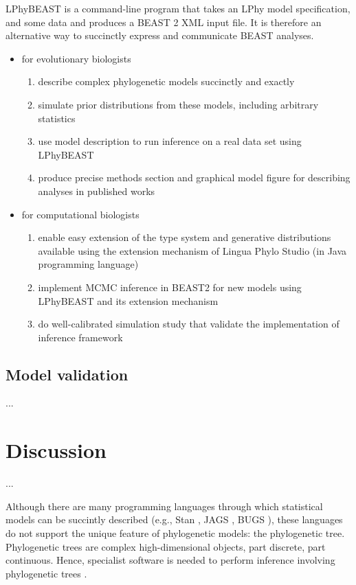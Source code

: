 \documentclass[10pt,letterpaper,table]{article}
\begin{document}
{LPhyBEAST is a command-line program that takes an LPhy model
specification, and some data and produces a BEAST 2 XML input file.
It is therefore an alternative way to succinctly express and
communicate BEAST analyses.

\begin{itemize}
\item for evolutionary biologists
\begin{enumerate}
\item describe complex phylogenetic models succinctly and exactly
\item simulate prior distributions from these models, including arbitrary statistics
\item use model description to run inference on a real data set using LPhyBEAST
\item produce precise methods section and graphical model figure for describing analyses in published works
\end{enumerate}
\item for computational biologists
\begin{enumerate}
\item enable easy extension of the type system and generative distributions available using the extension mechanism of Lingua Phylo Studio (in Java programming language)
\item implement MCMC inference in BEAST2 for new models using LPhyBEAST and its extension mechanism
\item do well-calibrated simulation study that validate the implementation of inference framework
\end{enumerate}
\end{itemize}

\subsection*{Model validation}
...


\section*{Discussion}
...

Although there are many
programming languages through which statistical 
models can be succintly described (e.g., Stan
\cite{carpenter2017stan}, JAGS \cite{plummer2003jags}, BUGS
\cite{lunn2009bugs, gilks1994language}), these languages do not
support the unique feature of phylogenetic models: the phylogenetic
tree.
Phylogenetic trees are complex high-dimensional objects, part
discrete, part continuous.
Hence, specialist software is needed to perform inference
involving phylogenetic trees
\cite{hohna2016revbayes,bouckaert2019beastanalysis}.

}
\end{document}
